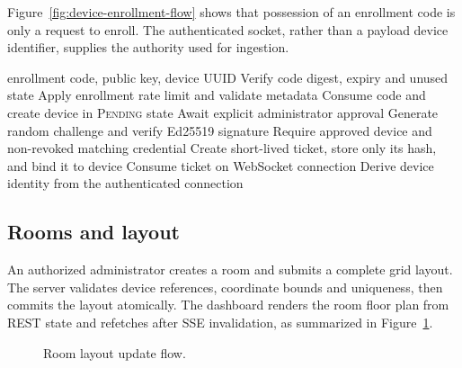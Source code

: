 \documentclass[12pt,a4paper]{report}
\begin{document}
Figure~\ref{fig:device-enrollment-flow} shows that possession of an enrollment
code is only a request to enroll. The authenticated socket, rather than a
payload device identifier, supplies the authority used for ingestion.

\begin{algorithm}[H]
\caption{Device enrollment and ticket issuance}
\label{alg:enrollment}
\begin{algorithmic}[1]
\Require enrollment code, public key, device UUID
\State Verify code digest, expiry and unused state
\State Apply enrollment rate limit and validate metadata
\State Consume code and create device in \textsc{Pending} state
\State Await explicit administrator approval
\State Generate random challenge and verify Ed25519 signature
\State Require approved device and non-revoked matching credential
\State Create short-lived ticket, store only its hash, and bind it to device
\State Consume ticket on WebSocket connection
\State Derive device identity from the authenticated connection
\end{algorithmic}
\end{algorithm}

\subsection{Rooms and layout}
An authorized administrator creates a room and submits a complete grid layout.
The server validates device references, coordinate bounds and uniqueness, then
commits the layout atomically. The dashboard renders the room floor plan from
REST state and refetches after SSE invalidation, as summarized in
Figure~\ref{fig:room-layout-flow}.

\begin{figure}[H]
\centering
{}
\caption{Room layout update flow.}
\label{fig:room-layout-flow}
\end{figure}
\end{document}
